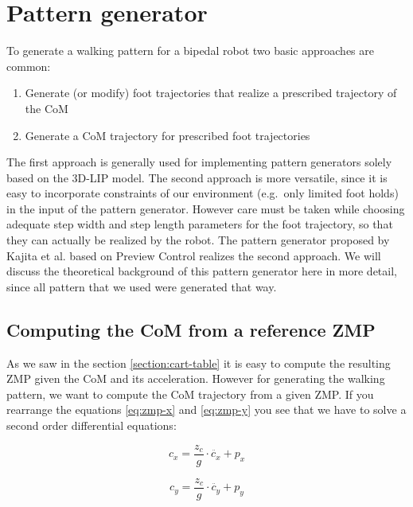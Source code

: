 \documentclass[english,ngerman]{KITreprt}
\begin{document}
\chapter{Pattern generator}\label{pattern-generator}

To generate a walking pattern for a bipedal robot two basic approaches
are common:

\begin{enumerate}
\def\labelenumi{\arabic{enumi}.}
\item
  Generate (or modify) foot trajectories that realize a prescribed
  trajectory of the CoM
\item
  Generate a CoM trajectory for prescribed foot trajectories
\end{enumerate}

The first approach is generally used for implementing pattern generators
solely based on the 3D-LIP model. \cite{kajita20013d} The second
approach is more versatile, since it is easy to incorporate constraints
of our environment (e.g.~only limited foot holds) in the input of the
pattern generator. However care must be taken while choosing adequate
step width and step length parameters for the foot trajectory, so that
they can actually be realized by the robot. The pattern generator
proposed by Kajita et al. \cite{kajita2003biped} based on Preview
Control realizes the second approach. We will discuss the theoretical
background of this pattern generator here in more detail, since all
pattern that we used were generated that way.

\section{Computing the CoM from a reference
ZMP}\label{computing-the-com-from-a-reference-zmp}

As we saw in the section \ref{section:cart-table} it is easy to compute
the resulting ZMP given the CoM and its acceleration. However for
generating the walking pattern, we want to compute the CoM trajectory
from a given ZMP. If you rearrange the equations \ref{eq:zmp-x} and
\ref{eq:zmp-y} you see that we have to solve a second order differential
equations:

\begin{equation} \label{eq:com-x}
c_x = \frac{z_c}{g} \cdot \ddot{c_x} + p_x
\end{equation}

\begin{equation} \label{eq:com-y}
c_y = \frac{z_c}{g} \cdot \ddot{c_y} + p_y
\end{equation}
\end{document}
